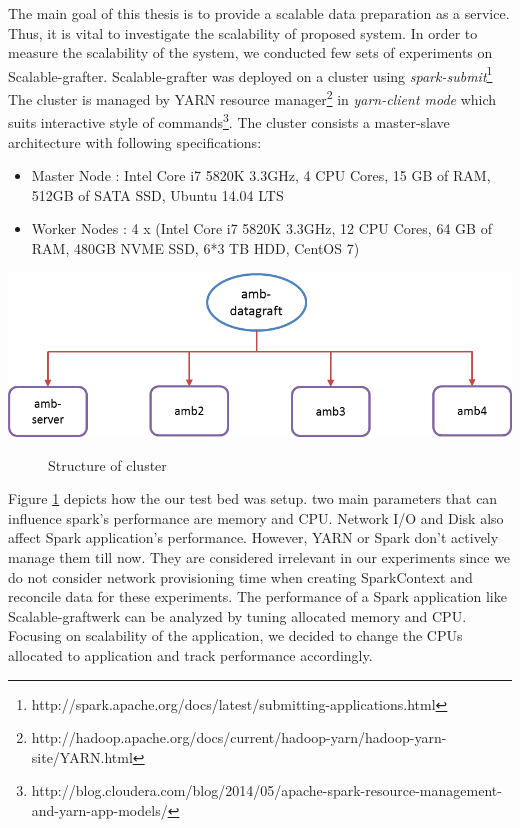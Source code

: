 The main goal of this thesis is to provide a scalable data preparation as a service. Thus, it is vital to investigate the scalability of proposed system. In order to measure the scalability of the system, we conducted few sets of experiments on Scalable-grafter. Scalable-grafter was deployed on a cluster using \textit{spark-submit}\footnote{http://spark.apache.org/docs/latest/submitting-applications.html} The cluster is managed by YARN resource manager\footnote{http://hadoop.apache.org/docs/current/hadoop-yarn/hadoop-yarn-site/YARN.html} in \textit{yarn-client mode} which suits interactive style of commands\footnote{http://blog.cloudera.com/blog/2014/05/apache-spark-resource-management-and-yarn-app-models/}. The cluster consists a master-slave architecture with following specifications:
\begin{itemize}
\item Master  Node : 	Intel Core i7 5820K 3.3GHz, 4 CPU Cores, 15 GB of RAM, 512GB of SATA SSD, Ubuntu 14.04 LTS
\item Worker Nodes : 4 x (Intel Core i7 5820K 3.3GHz, 12 CPU Cores, 64 GB of RAM, 480GB NVME SSD, 6*3 TB HDD, CentOS 7)
\end{itemize}
\begin{center}
	\includegraphics[width=38em]{./Figures/cluster}
	\begin{figure}[htbp]
    \caption{Structure of cluster}
    \label{fig:cluster}
	\end{figure}
\end{center}
Figure \ref{fig:cluster} depicts how the our test bed was setup.   two main parameters that can influence spark's performance are memory and CPU. Network I/O and Disk also affect Spark application's performance. However, YARN or Spark don't actively manage them till now. They are considered irrelevant in our experiments since we do not consider network provisioning time when creating SparkContext and reconcile data for these experiments. The performance of a Spark application like Scalable-graftwerk can be analyzed by tuning allocated memory and CPU. Focusing on scalability of the application, we decided to change the CPUs allocated to application and track performance accordingly.

